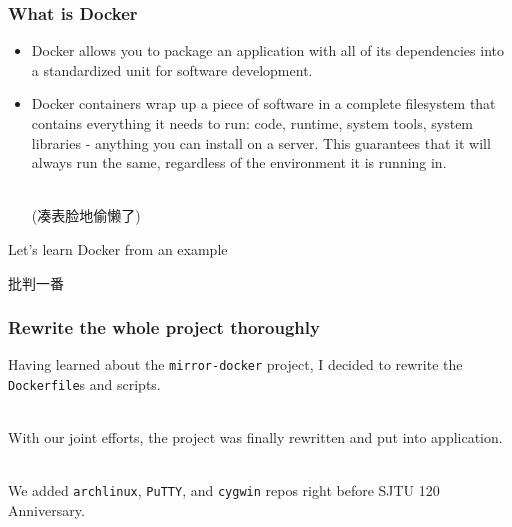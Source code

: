 \documentclass{beamer}
\begin{document}

\begin{frame}
\frametitle{What is Docker}
\begin{itemize}
\item Docker allows you to package an application with all of its dependencies
into a standardized unit for software development.
\item Docker containers wrap up a piece of software in a complete filesystem
that contains everything it needs to run: code, runtime, system tools, system
libraries - anything you can install on a server. This guarantees that it will
always run the same, regardless of the environment it is running in.\\~

\begin{CJK}{UTF8}{gbsn}
(凑表脸地偷懒了)
\end{CJK}
\end{itemize}
\end{frame}


\begin{frame}
\Large{\centerline{Let's learn Docker from an example}}
\end{frame}


\begin{frame}
\begin{CJK}{UTF8}{gbsn}
\Huge{\centerline{批判一番}}
\end{CJK}
\end{frame}


\begin{frame}
\frametitle{Rewrite the whole project thoroughly}
Having learned about the \texttt{mirror-docker} project, I decided to rewrite
the \texttt{Dockerfile}s and scripts.\\~

With our joint efforts, the project was finally rewritten and put into
application.\\~

We added \texttt{archlinux}, \texttt{PuTTY}, and \texttt{cygwin} repos right
before SJTU 120 Anniversary.
\end{frame}

\end{document}
